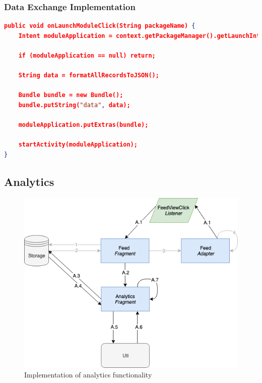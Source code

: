 \subsubsection{Data Exchange Implementation}
\begin{lstlisting}[language=json, caption={My Caption}, captionpos=b]
public void onLaunchModuleClick(String packageName) {
    Intent moduleApplication = context.getPackageManager().getLaunchIntentForPackage(packageName);
    
    if (moduleApplication == null) return;

    String data = formatAllRecordsToJSON();

    Bundle bundle = new Bundle();
    bundle.putString("data", data);

    moduleApplication.putExtras(bundle);

    startActivity(moduleApplication);
}

\end{lstlisting}

\subsection{Analytics}
\begin{figure}
    \centering
    \includegraphics[scale=0.6]{images/Anal_Imp.png}
    \caption{Implementation of analytics functionality}
    \label{fig:impl_analytics}
\end{figure}


